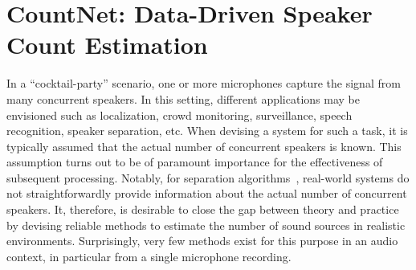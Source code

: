 \chapter[Data-Driven Speaker Count Estimation]{CountNet: Data-Driven Speaker Count Estimation}
\label{cha:countnet}


In a ``cocktail-party'' scenario, one or more microphones capture the signal from many concurrent speakers. In this setting, different applications may be envisioned such as localization, crowd monitoring, surveillance, speech recognition, speaker separation, etc.
When devising a system for such a task, it is typically assumed that the actual number of concurrent speakers is known.
This assumption turns out to be of paramount importance for the effectiveness of subsequent processing.
Notably, for separation algorithms~\cite{common10},
real-world systems do not straightforwardly provide information about the actual number of concurrent speakers.
It, therefore, is desirable to close the gap between theory and practice by devising reliable methods to estimate the number of sound sources in realistic environments.
Surprisingly, very few methods exist for this purpose in an audio context, in particular from a single microphone recording.


